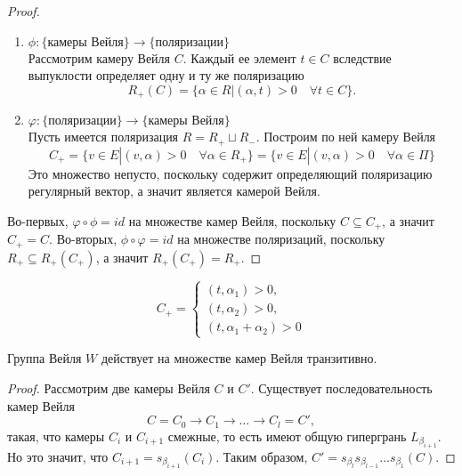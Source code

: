 \documentclass[a4article]{article}
\begin{document}
\begin{proof}
    \begin{enumerate}
        \item $\phi: \{\text{камеры Вейля}\} \rightarrow \{\text{поляризации}\}$\\
        Рассмотрим камеру Вейля $C$. Каждый ее элемент $t \in C$ вследствие выпуклости определяет одну и ту же поляризацию
    $$R_{+}(C)=\{\alpha \in R|(\alpha, t)>0 \quad \forall t \in C\}.$$
        \item $\varphi: \{\text{поляризации}\} \rightarrow \{\text{камеры Вейля}\}$\\
        Пусть имеется поляризация $R=R_{+}\sqcup R_{-}$. Построим по ней камеру Вейля $$C_{+}=\{v \in E|(v, \alpha)>0 \quad \forall \alpha \in R_{+}\}=\{v \in E|(v, \alpha)>0 \quad \forall \alpha \in \Pi\}$$
        Это множество непусто, поскольку содержит определяющий поляризацию регулярный вектор, а значит является камерой Вейля.
    \end{enumerate}
   Во-первых, $\varphi \circ \phi = id$ на множестве камер Вейля, поскольку $C \subseteq C_{+}$, а значит $C_{+} = C$. Во-вторых, $\phi \circ \varphi = id$ на множестве поляризаций, поскольку $R_{+} \subseteq R_{+}(C_{+})$, а значит $R_{+}(C_{+}) = R_{+}$.
\end{proof}
\begin{example}
    \begin{equation}
        C_{+}=\begin{cases}
            (t, \alpha_1) > 0,\\
            (t, \alpha_2) > 0,\\
            (t, \alpha_1+\alpha_2) > 0
        \end{cases}
    \end{equation}
\end{example}
\begin{theorem}
\label{weyltrans}
    Группа Вейля $W$ действует на множестве камер Вейля транзитивно.
\end{theorem}
\begin{proof}
    Рассмотрим две камеры Вейля $C$ и $C'$. Существует последовательность камер Вейля $$C = C_0 \rightarrow C_1 \rightarrow \ldots \rightarrow C_l = C',$$
    такая, что камеры $C_i$ и $C_{i+1}$ смежные, то есть имеют общую гипергрань $L_{\beta_{i+1}}$. Но это значит, что $C_{i+1}=s_{\beta_{i+1}}(C_{i})$. Таким образом, $C'=s_{\beta_l}s_{\beta_{l-1}}\ldots s_{\beta_1}(C)$.
\end{proof}
\end{document}
